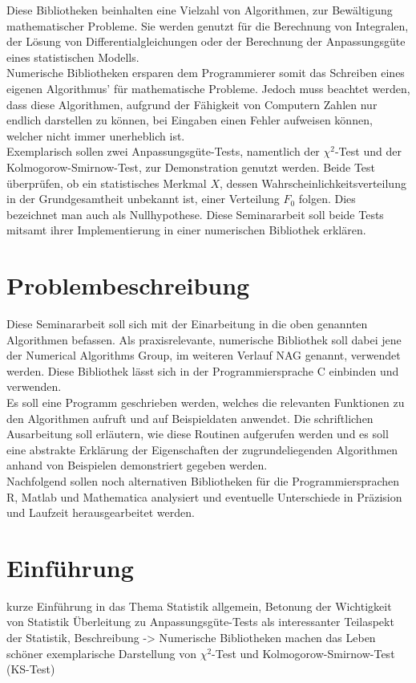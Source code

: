 \documentclass{article}
\begin{document}
Diese Bibliotheken beinhalten eine Vielzahl von Algorithmen, zur Bewältigung mathematischer Probleme. Sie werden genutzt für die Berechnung von Integralen, der Lösung von Differentialgleichungen oder der Berechnung der Anpassungsgüte eines statistischen Modells.\\
Numerische Bibliotheken ersparen dem Programmierer somit das Schreiben eines eigenen Algorithmus' für mathematische Probleme. Jedoch muss beachtet werden, dass diese Algorithmen, aufgrund der Fähigkeit von Computern Zahlen nur endlich darstellen zu können, bei Eingaben einen Fehler aufweisen können, welcher nicht immer unerheblich ist.\\
Exemplarisch sollen zwei Anpassungsgüte-Tests, namentlich der $\chi^2$-Test und der Kolmogorow-Smirnow-Test, zur Demonstration genutzt werden.
Beide Test überprüfen, ob ein statistisches Merkmal $X$, dessen Wahrscheinlichkeitsverteilung in der Grundgesamtheit unbekannt ist, einer Verteilung $F_0$ folgen. Dies bezeichnet man auch als Nullhypothese.
Diese Seminararbeit soll beide Tests mitsamt ihrer Implementierung in einer numerischen Bibliothek erklären.

\newpage
\section{Problembeschreibung}
Diese Seminararbeit soll sich mit der Einarbeitung in die oben genannten Algorithmen befassen.
Als praxisrelevante, numerische Bibliothek soll dabei jene der Numerical Algorithms Group, im weiteren Verlauf NAG genannt, verwendet werden. Diese Bibliothek lässt sich in der Programmiersprache C einbinden und verwenden.\\
Es soll eine Programm geschrieben werden, welches die relevanten Funktionen zu den Algorithmen aufruft und auf Beispieldaten anwendet. Die schriftlichen Ausarbeitung soll erläutern, wie diese Routinen aufgerufen werden und es soll eine abstrakte Erklärung der Eigenschaften der zugrundeliegenden Algorithmen anhand von Beispielen demonstriert gegeben werden.\\
Nachfolgend sollen noch alternativen Bibliotheken für die Programmiersprachen R, Matlab und Mathematica analysiert und eventuelle Unterschiede in Präzision und Laufzeit herausgearbeitet werden.

\newpage
\section{Einführung}
kurze Einführung in das Thema Statistik allgemein, Betonung der Wichtigkeit von Statistik
Überleitung zu Anpassungsgüte-Tests als interessanter Teilaspekt der Statistik, Beschreibung
-> Numerische Bibliotheken machen das Leben schöner
exemplarische Darstellung von $\chi^2$-Test und Kolmogorow-Smirnow-Test (KS-Test)
\end{document}
